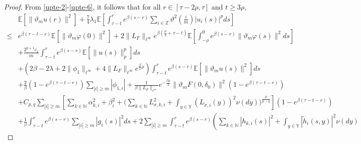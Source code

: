 \documentclass[11pt]{article}
\numberwithin{equation}{section}
\theoremstyle{plain}
\begin{document}
\begin{proof}
 From \eqref{upte-2}-\eqref{upte-6}, it follows that for all $r \in [\tau-2\rho, \tau]$ and $t \ge 3\rho$,
 \begin{align}\label{upte-7}
        & \mathbb{E} \left[ \| \vartheta_m  u(r)\|^2 \right]
           + \frac{7}{4} \lambda_1 \mathbb{E}
                   \left[ \int_{\tau-t}^{r} e^{\beta (s-r)}
                                \sum_{i \in \mathbb{Z}}
                                      \vartheta^2(\frac{i}{m}) |u_i(s)|^p ds
                   \right]  \nonumber\\
   \le & e^{\beta (\tau-t-r)} \mathbb{E} \left[ \| \vartheta_m \varphi(0) \|^2 \right]
            + 2 \|L_{F}\|_{\ell^\infty} e^{\beta(\frac{\rho}{2}+\tau-t) }
                      \mathbb{E}
                         \left[ \int_{-\rho}^{0} e^{\beta (s-r)} \|\vartheta_m \varphi(s)\|^2 ds \right]  \nonumber\\
        & + \frac{2^{p+1} c_1}{m}
              \int_{\tau-t}^{r} e^{\beta (s-r)} \mathbb{E} \left[ \|u(s)\|_p^p \right] ds  \nonumber\\
        & + \left( 2\beta - 2\lambda 
                                    + 2\|\phi_1\|_{\ell^\infty} 
                                    + 4 \|L_{F}\|_{\ell^\infty} e^{\frac{\beta}{2} \rho} 
               \right)
               \int_{\tau-t}^{r} e^{\beta (s-r)} \mathbb{E}
                    \left[ \|\vartheta_m u(s)\|^2 \right] ds  \nonumber\\
        & + \frac{2}{\beta} (1 - e^{\beta(\tau-t-r)}) \sum_{|i| \ge m} |\phi_{1,i}|
            + \frac{1}{\beta \|L_{F}\|_{\ell^\infty} } 
                           e^{- \frac{\beta \rho}{2} } 
                                    \|\vartheta_m F(0,\delta_0)\|^2
                                          (1 - e^{\beta(\tau-t-r)}) \nonumber\\
        & + C_{p,q} \sum_{|i| \ge m}
               \left[ \sum_{k \in \mathbb{N} } \alpha_{k,i}^2
                        + \beta_i^2
                        + \Big( \sum_{k \in \mathbb{N} } L^2_{\sigma,k,i} 
                                     + \int_{y \in \mathbb{Y} } (L_{\tilde{\sigma},i}(y) )^2 \nu(dy)
                           \Big)^{ \frac{p}{p-q} }
               \right]
              (1 - e^{\beta(\tau-t-r)} )  \nonumber\\
        & + \frac{1}{\beta} \int_{\tau-t}^{r} e^{\beta (s-r)} \sum_{|i| \ge m} |g_i(s)|^2 ds
            + 2 \sum_{|i|\ge m}
                 \int_{\tau-t}^{r} e^{\beta (s-r)} 
                          \left( \sum_{k \in \mathbb{N} } |h_{k,i}(s)|^2 
                                    + \int_{y \in \mathbb{Y} } |\widetilde{h}_{i}(s,y)|^2 \nu(dy)

\end{align}
\end{proof}
\end{document}
